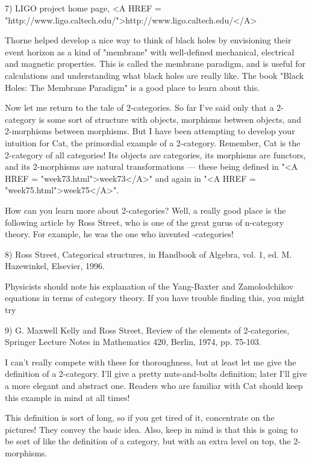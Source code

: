 7) LIGO project home page, <A HREF = "http://www.ligo.caltech.edu/">http://www.ligo.caltech.edu/</A>

Thorne helped develop a nice way to think of black holes by envisioning
their event horizon as a kind of "membrane" with well-defined
mechanical, electrical and magnetic properties.  This is called the
membrane paradigm, and is useful for calculations and understanding what
black holes are really like.  The book "Black Holes: The Membrane
Paradigm" is a good place to learn about this.


Now let me return to the tale of 2-categories.  So far I've said only
that a 2-category is some sort of structure with objects, morphisms
between objects, and 2-morphisms between morphisms.  But I have been
attempting to develop your intuition for Cat, the primordial example of
a 2-category.  Remember, Cat is the 2-category of all categories!  Its
objects are categories, its morphisms are functors, and its 2-morphisms
are natural transformations --- these being defined in "<A HREF = "week73.html">week73</A>" and
again in "<A HREF = "week75.html">week75</A>".  

How can you learn more about 2-categories?  Well, a really good place is
the following article by Ross Street, who is one of the great gurus of
n-category theory.  For example, he was the one who invented
\omega -categories!

8) Ross Street, Categorical structures, in Handbook of Algebra, vol. 1,
ed. M. Hazewinkel, Elsevier, 1996.  

Physicists should note his explanation of the Yang-Baxter and
Zamolodchikov equations in terms of category theory.  If you have
trouble finding this, you might try

9) G. Maxwell Kelly and Ross Street, Review of the elements of 2-categories,
Springer Lecture Notes in Mathematics 420, Berlin, 1974, pp. 75-103.

I can't really compete with these for thoroughness, but at least let me
give the definition of a 2-category.  I'll give a pretty nuts-and-bolts
definition; later I'll give a more elegant and abstract one.  Readers
who are familiar with Cat should keep this example in mind at all times!

This definition is sort of long, so if you get tired of it, concentrate
on the pictures!  They convey the basic idea.  Also, keep in mind is
that this is going to be sort of like the definition of a category, but
with an extra level on top, the 2-morphisms.

